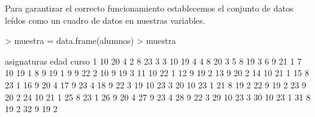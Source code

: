 \documentclass[a4paper]{article}
\begin{document}
Para garantizar el correcto funcionamiento establecemos el conjunto de datos leídos como un cuadro de datos en nuestras variables.
\begin{Schunk}
\begin{Sinput}
> muestra = data.frame(alumnos)
> muestra
\end{Sinput}
\begin{Soutput}
   asignaturas edad curso
1           10   20     4
2            8   23     3
3           10   19     4
4            8   20     3
5            8   19     3
6            9   21     1
7           10   19     1
8            9   19     1
9            9   22     2
10           9   19     3
11          10   22     1
12           9   19     2
13           9   20     2
14          10   21     1
15           8   23     1
16           9   20     4
17           9   23     4
18           9   22     3
19          10   23     3
20          10   23     1
21           8   19     2
22           9   19     2
23           9   20     2
24          10   21     1
25           8   23     1
26           9   20     4
27           9   23     4
28           9   22     3
29          10   23     3
30          10   23     1
31           8   19     2
32           9   19     2
\end{Soutput}
\end{Schunk}
\end{document}
